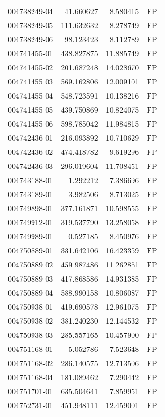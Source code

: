 \begin{tabular}{lrrl}
004738249-04 &   41.660627 &     8.580415 &   FP \\
004738249-05 &  111.632632 &     8.278749 &   FP \\
004738249-06 &   98.123423 &     8.112789 &   FP \\
004741455-01 &  438.827875 &    11.885749 &   FP \\
004741455-02 &  201.687248 &    14.028670 &   FP \\
004741455-03 &  569.162806 &    12.009101 &   FP \\
004741455-04 &  548.723591 &    10.138216 &   FP \\
004741455-05 &  439.750869 &    10.824075 &   FP \\
004741455-06 &  598.785042 &    11.984815 &   FP \\
004742436-01 &  216.093892 &    10.710629 &   FP \\
004742436-02 &  474.418782 &     9.619296 &   FP \\
004742436-03 &  296.019604 &    11.708451 &   FP \\
004743188-01 &    1.292212 &     7.386696 &   FP \\
004743189-01 &    3.982506 &     8.713025 &   FP \\
004749898-01 &  377.161871 &    10.598555 &   FP \\
004749912-01 &  319.537790 &    13.258058 &   FP \\
004749989-01 &    0.527185 &     8.450976 &   FP \\
004750889-01 &  331.642106 &    16.423359 &   FP \\
004750889-02 &  459.987486 &    11.262861 &   FP \\
004750889-03 &  417.868586 &    14.931385 &   FP \\
004750889-04 &  588.990158 &    10.806087 &   FP \\
004750938-01 &  419.690578 &    12.961075 &   FP \\
004750938-02 &  381.240230 &    12.144532 &   FP \\
004750938-03 &  285.557165 &    10.457900 &   FP \\
004751168-01 &    5.052786 &     7.523648 &   FP \\
004751168-02 &  286.140575 &    12.713506 &   FP \\
004751168-04 &  181.089462 &     7.290442 &   FP \\
004751701-01 &  635.504641 &     7.859951 &   FP \\
004752731-01 &  451.948111 &    12.459001 &   FP \\

\end{tabular}
